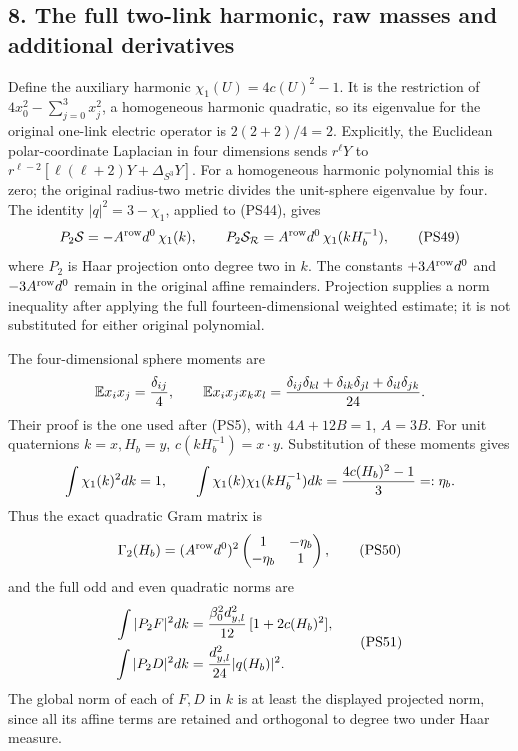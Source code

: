 \documentclass[11pt]{article}
\begin{document}
\subsection*{8. The full two-link harmonic, raw masses and additional derivatives}

Define the auxiliary harmonic \(\chi_1(U)=4c(U)^2-1\).
It is the restriction of
\(4x_0^2-\sum_{j=0}^3x_j^2\), a homogeneous harmonic
quadratic, so its eigenvalue for the original one-link electric
operator is \(2(2+2)/4=2\).
Explicitly, the Euclidean polar-coordinate Laplacian in four
dimensions sends \(r^\ell Y\) to
\(r^{\ell-2}[\ell(\ell+2)Y+\Delta_{S^3}Y]\).
For a homogeneous harmonic polynomial this is zero; the original
radius-two metric divides the unit-sphere eigenvalue by four.
The identity \(|q|^2=3-\chi_1\), applied to (PS44), gives
\[
 P_2\mathcal S=-A^{\rm row}d^0\,\chi_1(k),\qquad
 P_2\mathcal S_{\mathcal R}
             =A^{\rm row}d^0\,\chi_1(kH_b^{-1}),
 \tag{PS49}
\]
where \(P_2\) is Haar projection onto degree two in \(k\).
The constants \(+3A^{\rm row}d^0\) and
\(-3A^{\rm row}d^0\) remain in the original affine remainders.
Projection supplies a norm inequality after applying the full
fourteen-dimensional weighted estimate; it is not substituted
for either original polynomial.

The four-dimensional sphere moments are
\[
 \mathbb Ex_ix_j={\delta_{ij}\over4},\qquad
 \mathbb Ex_ix_jx_kx_l
   ={\delta_{ij}\delta_{kl}+\delta_{ik}\delta_{jl}
                               +\delta_{il}\delta_{jk}\over24}.
 \]
Their proof is the one used after (PS5), with
\(4A+12B=1\), \(A=3B\). For unit quaternions \(k=x,H_b=y\),
\(c(kH_b^{-1})=x\cdot y\). Substitution of these moments gives
\[
 \int\chi_1(k)^2dk=1,\qquad
 \int\chi_1(k)\chi_1(kH_b^{-1})dk
          ={4c(H_b)^2-1\over3}=:\eta_b.
 \]
Thus the exact quadratic Gram matrix is
\[
 \Gamma_2(H_b)=(A^{\rm row}d^0)^2
          \begin{pmatrix}1&-\eta_b\\-\eta_b&1\end{pmatrix},
 \tag{PS50}
\]
and the full odd and even quadratic norms are
\[
 \begin{aligned}
 \int|P_2F|^2dk
    &={\beta_0^2d_{y,l}^2\over12}\,[1+2c(H_b)^2],\\
 \int|P_2D|^2dk
    &={d_{y,l}^2\over24}|q(H_b)|^2.
 \end{aligned}
 \tag{PS51}
\]
The global norm of each of \(F,D\) in \(k\) is at least the
displayed projected norm, since all its affine terms are retained
and orthogonal to degree two under Haar measure.
\end{document}
